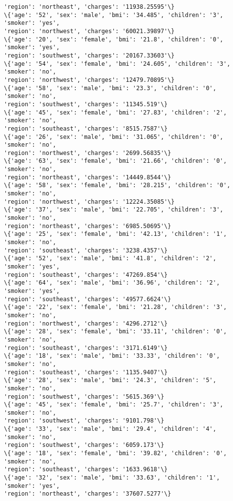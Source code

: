 \documentclass[11pt]{article}
\begin{document}
\begin{Verbatim}[commandchars=\\\{\}]
'region': 'northeast', 'charges': '11938.25595'\}
\{'age': '52', 'sex': 'male', 'bmi': '34.485', 'children': '3', 'smoker': 'yes',
'region': 'northwest', 'charges': '60021.39897'\}
\{'age': '20', 'sex': 'female', 'bmi': '21.8', 'children': '0', 'smoker': 'yes',
'region': 'southwest', 'charges': '20167.33603'\}
\{'age': '54', 'sex': 'female', 'bmi': '24.605', 'children': '3', 'smoker': 'no',
'region': 'northwest', 'charges': '12479.70895'\}
\{'age': '58', 'sex': 'male', 'bmi': '23.3', 'children': '0', 'smoker': 'no',
'region': 'southwest', 'charges': '11345.519'\}
\{'age': '45', 'sex': 'female', 'bmi': '27.83', 'children': '2', 'smoker': 'no',
'region': 'southeast', 'charges': '8515.7587'\}
\{'age': '26', 'sex': 'male', 'bmi': '31.065', 'children': '0', 'smoker': 'no',
'region': 'northwest', 'charges': '2699.56835'\}
\{'age': '63', 'sex': 'female', 'bmi': '21.66', 'children': '0', 'smoker': 'no',
'region': 'northeast', 'charges': '14449.8544'\}
\{'age': '58', 'sex': 'female', 'bmi': '28.215', 'children': '0', 'smoker': 'no',
'region': 'northwest', 'charges': '12224.35085'\}
\{'age': '37', 'sex': 'male', 'bmi': '22.705', 'children': '3', 'smoker': 'no',
'region': 'northeast', 'charges': '6985.50695'\}
\{'age': '25', 'sex': 'female', 'bmi': '42.13', 'children': '1', 'smoker': 'no',
'region': 'southeast', 'charges': '3238.4357'\}
\{'age': '52', 'sex': 'male', 'bmi': '41.8', 'children': '2', 'smoker': 'yes',
'region': 'southeast', 'charges': '47269.854'\}
\{'age': '64', 'sex': 'male', 'bmi': '36.96', 'children': '2', 'smoker': 'yes',
'region': 'southeast', 'charges': '49577.6624'\}
\{'age': '22', 'sex': 'female', 'bmi': '21.28', 'children': '3', 'smoker': 'no',
'region': 'northwest', 'charges': '4296.2712'\}
\{'age': '28', 'sex': 'female', 'bmi': '33.11', 'children': '0', 'smoker': 'no',
'region': 'southeast', 'charges': '3171.6149'\}
\{'age': '18', 'sex': 'male', 'bmi': '33.33', 'children': '0', 'smoker': 'no',
'region': 'southeast', 'charges': '1135.9407'\}
\{'age': '28', 'sex': 'male', 'bmi': '24.3', 'children': '5', 'smoker': 'no',
'region': 'southwest', 'charges': '5615.369'\}
\{'age': '45', 'sex': 'female', 'bmi': '25.7', 'children': '3', 'smoker': 'no',
'region': 'southwest', 'charges': '9101.798'\}
\{'age': '33', 'sex': 'male', 'bmi': '29.4', 'children': '4', 'smoker': 'no',
'region': 'southwest', 'charges': '6059.173'\}
\{'age': '18', 'sex': 'female', 'bmi': '39.82', 'children': '0', 'smoker': 'no',
'region': 'southeast', 'charges': '1633.9618'\}
\{'age': '32', 'sex': 'male', 'bmi': '33.63', 'children': '1', 'smoker': 'yes',
'region': 'northeast', 'charges': '37607.5277'\}

\end{Verbatim}
\end{document}
